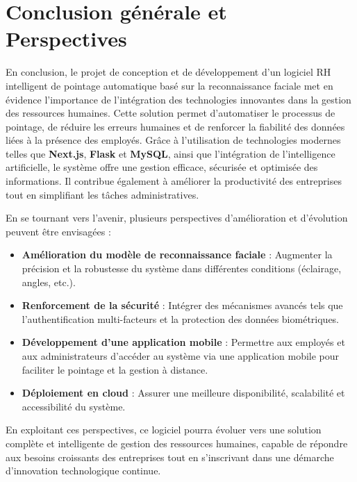 \chapter*{Conclusion générale et Perspectives}
\setlength{\intextsep}{6pt}
\setlength{\textfloatsep}{8pt}
\setlength{\floatsep}{6pt}
\setlength{\abovecaptionskip}{3pt}
\setlength{\belowcaptionskip}{1pt}
\setlength{\LTpre}{3pt}
\setlength{\LTpost}{3pt}

En conclusion, le projet de conception et de développement d’un logiciel RH intelligent de pointage automatique basé sur la reconnaissance faciale met en évidence l’importance de l’intégration des technologies innovantes dans la gestion des ressources humaines. Cette solution permet d’automatiser le processus de pointage, de réduire les erreurs humaines et de renforcer la fiabilité des données liées à la présence des employés.  
Grâce à l’utilisation de technologies modernes telles que \textbf{Next.js}, \textbf{Flask} et \textbf{MySQL}, ainsi que l’intégration de l’intelligence artificielle, le système offre une gestion efficace, sécurisée et optimisée des informations. Il contribue également à améliorer la productivité des entreprises tout en simplifiant les tâches administratives.

En se tournant vers l’avenir, plusieurs perspectives d’amélioration et d’évolution peuvent être envisagées :
\begin{itemize}
    \item \textbf{Amélioration du modèle de reconnaissance faciale} : Augmenter la précision et la robustesse du système dans différentes conditions (éclairage, angles, etc.).
    \item \textbf{Renforcement de la sécurité} : Intégrer des mécanismes avancés tels que l’authentification multi-facteurs et la protection des données biométriques.
    \item \textbf{Développement d’une application mobile} : Permettre aux employés et aux administrateurs d’accéder au système via une application mobile pour faciliter le pointage et la gestion à distance.
    \item \textbf{Déploiement en cloud} : Assurer une meilleure disponibilité, scalabilité et accessibilité du système.
\end{itemize}

En exploitant ces perspectives, ce logiciel pourra évoluer vers une solution complète et intelligente de gestion des ressources humaines, capable de répondre aux besoins croissants des entreprises tout en s’inscrivant dans une démarche d’innovation technologique continue.